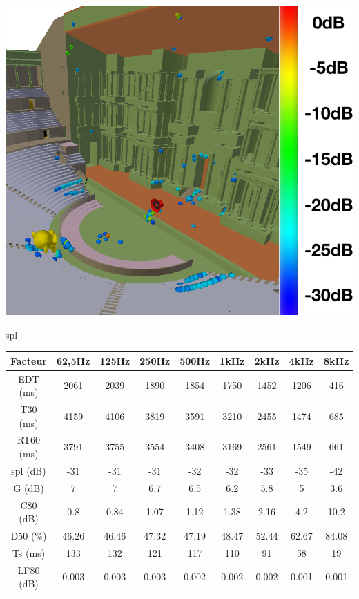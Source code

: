 \begin{figureth}
\begin{subfigureth}{0.61\textwidth}
		\includegraphics[width=\linewidth]{images/SI30dB}
		\caption{Source-images projetées sur les parois du théâtre jusqu'à -30dB.}
		\label{SI30dB}
	\end{subfigureth}
\caption{Source-images dans le théâtre d'Orange dans sa configuration initiale pour 1 million de rayons jusqu'à -30dB.}	
\label{SITheatre30}
\end{figureth}


\gls{spl}

\begin{tableth} 
 \begin{tabular}{| *{9}{c|}} 
 \hline 
 Facteur & 62,5Hz & 125Hz & 250Hz & 500Hz & 1kHz & 2kHz & 4kHz & 8kHz \\ 
 \hline 
 \hline 
\gls{EDT} (ms)& 2061& 2039& 1890& 1854& 1750& 1452& 1206& 416 \\ 
 \hline 
\gls{T30} (ms)& 4159& 4106& 3819& 3591& 3210& 2455& 1474& 685 \\ 
 \hline 
\gls{RT60} (ms)& 3791& 3755& 3554& 3408& 3169& 2561& 1549& 661 \\ 
 \hline 
\gls{spl} (dB)& -31& -31& -31& -32& -32& -33& -35& -42 \\ 
 \hline 
\gls{G} (dB)& 7& 7& 6.7& 6.5& 6.2& 5.8& 5& 3.6 \\ 
 \hline 
\gls{C80} (dB)& 0.8& 0.84& 1.07& 1.12& 1.38& 2.16& 4.2& 10.2 \\ 
 \hline 
\gls{D50} (\%)& 46.26& 46.46& 47.32& 47.19& 48.47& 52.44& 62.67& 84.08 \\ 
 \hline 
\gls{Ts} (ms)& 133& 132& 121& 117& 110& 91& 58& 19 \\ 
 \hline 
\gls{LF80} (dB)& 0.003& 0.003& 0.003& 0.002& 0.002& 0.002& 0.001& 0.001 \\ 
 \hline 
\end{tabular}
 \caption{Facteurs perceptifs pour une source en [0 ; 5.6 ; 42.8] et un auditeur en [0 ; -16.5 ; 42.8] et 1000000 rayons dans la configuration initiale.} 
 \label{tab_fact_init} 
 \end{tableth}



